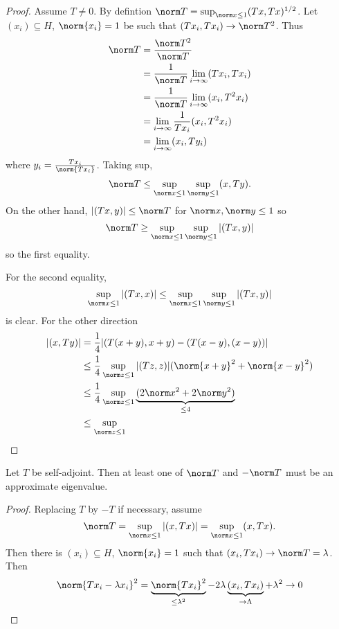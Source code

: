 \documentclass[a4paper]{article}
\begin{document}
\begin{proof}
  Assume \(T \neq 0\). By defintion \(\norm T = \sup_{\norm x \leq 1} (Tx, Tx)^{1/2}\). Let \((x_i) \subseteq H\), \(\norm{x_i} = 1\) be such that \((Tx_i, Tx_i) \to \norm T^2\). Thus
  \begin{align*}
    \norm T
    &= \frac{\norm T^2}{\norm T} \\
    &= \frac{1}{\norm T} \lim_{i \to \infty} (Tx_i, Tx_i) \\
    &= \frac{1}{\norm T} \lim_{i \to \infty} (x_i, T^2x_i) \\
    &= \lim_{i \to \infty} \frac{1}{T x_i} (x_i, T^2x_i) \\
    &= \lim_{i \to \infty} (x_i, Ty_i)
  \end{align*}
  where \(y_i = \frac{Tx_i}{\norm{Tx_i}}\). Taking sup,
  \[
    \norm T \leq \sup_{\norm x \leq 1} \sup_{\norm y \leq 1} (x, Ty).
  \]
  On the other hand, \(|(Tx, y)| \leq \norm T\) for \(\norm x, \norm y \leq 1\) so
  \[
    \norm T \geq \sup_{\norm x \leq 1} \sup_{\norm y \leq 1} |(Tx, y)|
  \]
  so the first equality.

  For the second equality,
  \[
    \sup_{\norm x \leq 1} |(Tx, x)| \leq \sup_{\norm x \leq 1} \sup_{\norm y \leq 1} |(Tx, y)|
  \]
  is clear. For the other direction
  \begin{align*}
    |(x, Ty)|
    &= \frac{1}{4} |(T(x + y), x + y) - (T(x - y), (x - y))| \\
    &\leq \frac{1}{4} \sup_{\norm z \leq 1} |(Tz, z)| (\norm{x + y}^2 + \norm{x - y}^2) \\
    &\leq \frac{1}{4} \sup_{\norm z \leq 1} \underbrace{(2 \norm x^2 + 2 \norm y^2)}_{\leq 4} \\
    &\leq \sup_{\norm z \leq 1} 
  \end{align*}
\end{proof}

\begin{lemma}
  Let \(T\) be self-adjoint. Then at least one of \(\norm T\) and \(- \norm T\) must be an approximate eigenvalue.
\end{lemma}

\begin{proof}
  Replacing \(T\) by \(-T\) if necessary, assume
  \[
    \norm T = \sup_{\norm x \leq 1} |(x, Tx)|= \sup_{\norm x \leq 1} (x, Tx).
  \]
  Then there is \((x_i) \subseteq H\), \(\norm{x_i} = 1\) such that \((x_i, Tx_i) \to \norm T = \lambda\). Then
  \[
    \norm{T x_i - \lambda x_i}^2
    = \underbrace{\norm{Tx_i}^2}_{\leq \lambda^2} - 2 \lambda \underbrace{(x_i, Tx_i)}_{\to \Lambda} + \lambda^2
    \to 0
  \]
\end{proof}
\end{document}
